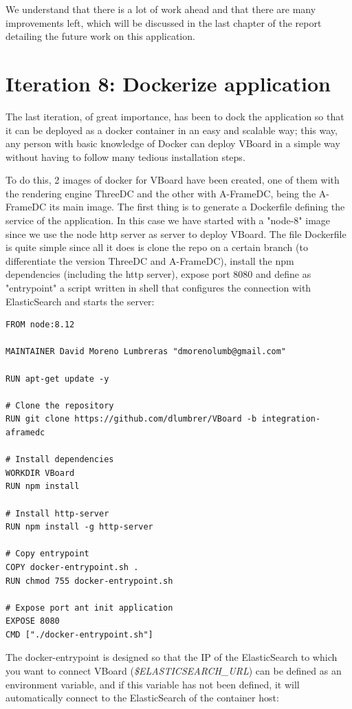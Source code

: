 \documentclass[a4paper, 12pt]{book}
\begin{document}
We understand that there is a lot of work ahead and that there are many improvements left, which will be discussed in the last chapter of the report detailing the future work on this application.

\section{Iteration 8: Dockerize application}
\label{sec:dockerize}

The last iteration, of great importance, has been to dock the application so that it can be deployed as a docker container in an easy and scalable way; this way, any person with basic knowledge of Docker can deploy VBoard in a simple way without having to follow many tedious installation steps.

To do this, 2 images of docker for VBoard have been created, one of them with the rendering engine ThreeDC and the other with A-FrameDC, being the A-FrameDC its main image. The first thing is to generate a Dockerfile defining the service of the application. In this case we have started with a "node-8" image since we use the node http server as server to deploy VBoard. The file Dockerfile is quite simple since all it does is clone the repo on a certain branch (to differentiate the version ThreeDC and A-FrameDC), install the npm dependencies (including the http server), expose port 8080 and define as "entrypoint" a script written in shell that configures the connection with ElasticSearch and starts the server:

\begin{lstlisting}[frame=single]
FROM node:8.12

MAINTAINER David Moreno Lumbreras "dmorenolumb@gmail.com"

RUN apt-get update -y

# Clone the repository
RUN git clone https://github.com/dlumbrer/VBoard -b integration-aframedc

# Install dependencies
WORKDIR VBoard
RUN npm install

# Install http-server
RUN npm install -g http-server

# Copy entrypoint
COPY docker-entrypoint.sh .
RUN chmod 755 docker-entrypoint.sh

# Expose port ant init application
EXPOSE 8080
CMD ["./docker-entrypoint.sh"]
\end{lstlisting}

The docker-entrypoint is designed so that the IP of the ElasticSearch to which you want to connect VBoard (\textit{\$ELASTICSEARCH\_URL}) can be defined as an environment variable, and if this variable has not been defined, it will automatically connect to the ElasticSearch of the container host:
\end{document}
